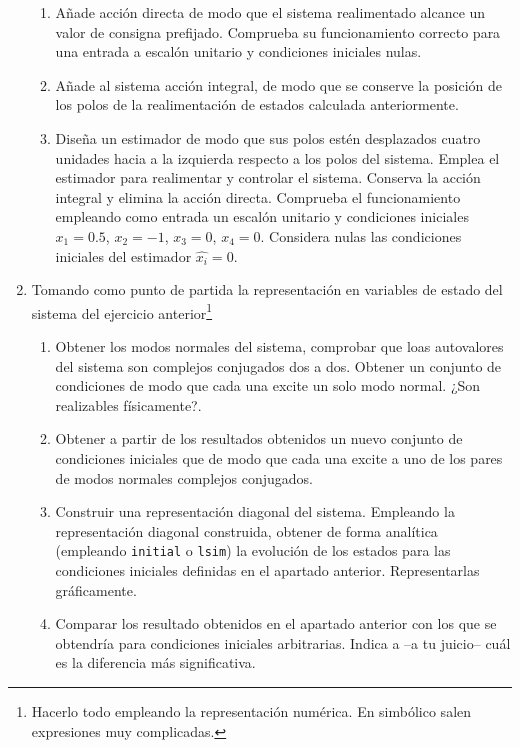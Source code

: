 \documentclass[10pt,a4paper]{article}
\begin{document}
\begin{enumerate}
\begin{enumerate}
\item Añade acción directa de modo que el sistema realimentado alcance un valor de consigna prefijado. Comprueba su funcionamiento correcto para una entrada a escalón unitario y condiciones iniciales nulas.

\item Añade al sistema acción integral, de modo que se conserve la posición de los polos de la realimentación de estados calculada anteriormente.

\item Diseña un estimador de modo que sus polos estén desplazados cuatro unidades hacia a la izquierda respecto a los polos del sistema. Emplea el estimador para realimentar y controlar el sistema. Conserva la acción integral y elimina la acción directa. Comprueba el funcionamiento empleando como entrada un escalón unitario y condiciones iniciales $x_1=0.5$, $x_2=-1$, $x_3=0$, $x_4=0$. Considera nulas las condiciones iniciales del estimador $\hat{x_i}=0$.


\end{enumerate}

\item Tomando como punto de partida la representación en variables de estado del sistema del ejercicio anterior\footnote{Hacerlo todo empleando la representación numérica. En simbólico salen expresiones muy complicadas.}
\begin{enumerate}
\item Obtener los modos normales del sistema, comprobar que loas autovalores del sistema son complejos conjugados dos a dos. Obtener un conjunto de condiciones de modo que cada una excite un solo modo normal. ¿Son realizables físicamente?.
\item Obtener a partir de los resultados obtenidos un nuevo conjunto de condiciones iniciales que de modo que cada una excite a uno de los pares de modos normales complejos conjugados.  
\item Construir una representación diagonal del sistema. Empleando la representación diagonal construida, obtener de forma analítica (empleando \texttt{initial} o \texttt{lsim}) la evolución de los estados para las condiciones iniciales definidas en el apartado anterior. Representarlas gráficamente.  
\item Comparar los resultado obtenidos en el apartado anterior con los que se obtendría para condiciones iniciales arbitrarias. Indica a --a tu juicio-- cuál es la diferencia  más significativa.
\end{enumerate}


\end{enumerate}
\end{document}
